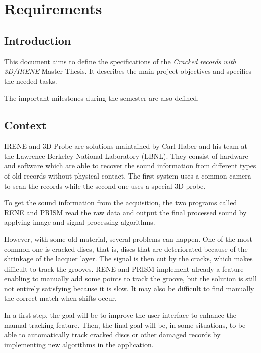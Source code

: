 
\cleardoublepage
\chapter{Requirements}
\label{chap:requirements}

\section{Introduction}

This document aims to define the specifications of the \emph{Cracked records with 3D/IRENE} Master Thesis. It describes the main project objectives and specifies the needed tasks.

The important milestones during the semester are also defined.

\section{Context}

IRENE and 3D Probe are solutions maintained by Carl Haber and his team at the Lawrence Berkeley National Laboratory (LBNL). They consist of hardware and software which are able to recover the sound information from different types of old records without physical contact. The first system uses a common camera to scan the records while the second one uses a special 3D probe.

To get the sound information from the acquisition, the two programs called RENE and PRISM read the raw data and output the final processed sound by applying image and signal processing algorithms.

However, with some old material, several problems can happen. One of the most common one is cracked discs, that is, discs that are deteriorated because of the shrinkage of the lacquer layer. The signal is then cut by the cracks, which makes difficult to track the grooves. RENE and PRISM implement already a feature enabling to manually add some points to track the groove, but the solution is still not entirely satisfying because it is slow. It may also be difficult to find manually the correct match when shifts occur.

In a first step, the goal will be to improve the user interface to enhance the manual tracking feature. Then, the final goal will be, in some situations, to be able to automatically track cracked discs or other damaged records by implementing new algorithms in the application.

